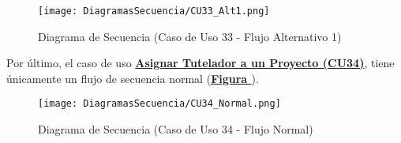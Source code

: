 \begin{figure}[!htbp]
  \centering
  \texttt{[image: DiagramasSecuencia/CU33\_Alt1.png]}
  \caption{Diagrama de Secuencia (Caso de Uso 33 - Flujo Alternativo 1)}
  \label{fig:Secuencia_CU33_Alt1}
\end{figure}
\FloatBarrier

\addtocounter{figura}{1} \pagebreak
Por último, el caso de uso \textbf{\hyperref[tab:curAsignarTutela]{Asignar Tutelador a un Proyecto (CU34)}}, tiene únicamente un flujo de secuencia normal (\textbf{\hyperref[fig:Secuencia_CU34_Normal]{Figura }}).
\begin{figure}[!htbp]
  \centering
  \texttt{[image: DiagramasSecuencia/CU34\_Normal.png]}
  \caption{Diagrama de Secuencia (Caso de Uso 34 - Flujo Normal)}
  \label{fig:Secuencia_CU34_Normal}
\end{figure}
\FloatBarrier
